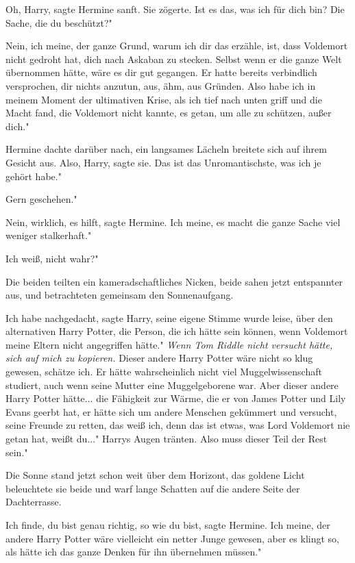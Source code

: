 \glqq Oh, Harry\grqq{}, sagte Hermine sanft. Sie zögerte. \glqq Ist es das, was
ich für dich bin? Die Sache, die du beschützt?"

\glqq Nein, ich meine, der ganze Grund, warum ich dir das erzähle, ist, dass
Voldemort nicht gedroht hat, dich nach Askaban zu stecken. Selbst wenn er die
ganze Welt übernommen hätte, wäre es dir gut gegangen. Er hatte bereits
verbindlich versprochen, dir nichts anzutun, aus, ähm, aus Gründen. Also habe
ich in meinem Moment der ultimativen Krise, als ich tief nach unten griff und
die Macht fand, die Voldemort nicht kannte, es getan, um alle zu schützen, außer
dich."

Hermine dachte darüber nach, ein langsames Lächeln breitete sich auf ihrem
Gesicht aus. \glqq Also, Harry\grqq{}, sagte sie. \glqq Das ist das
Unromantischste, was ich je gehört habe."

\glqq Gern geschehen."

\glqq Nein, wirklich, es hilft\grqq{}, sagte Hermine. \glqq Ich meine, es macht
die ganze Sache viel weniger stalkerhaft."

\glqq Ich weiß, nicht wahr?"

Die beiden teilten ein kameradschaftliches Nicken, beide sahen jetzt entspannter
aus, und betrachteten gemeinsam den Sonnenaufgang.

\glqq Ich habe nachgedacht\grqq{}, sagte Harry, seine eigene Stimme wurde leise,
\glqq über den alternativen Harry Potter, die Person, die ich hätte sein können,
wenn Voldemort meine Eltern nicht angegriffen hätte."
\emph{Wenn Tom Riddle nicht versucht hätte, sich auf mich zu kopieren.}
\glqq Dieser andere Harry Potter wäre nicht so klug gewesen, schätze ich. Er
hätte wahrscheinlich nicht viel Muggelwissenschaft studiert, auch wenn seine
Mutter eine Muggelgeborene war. Aber dieser andere Harry Potter hätte... die
Fähigkeit zur Wärme, die er von James Potter und Lily Evans geerbt hat, er hätte
sich um andere Menschen gekümmert und versucht, seine Freunde zu retten, das
weiß ich, denn das ist etwas, was Lord Voldemort nie getan hat, weißt du..."
Harrys Augen tränten. \glqq Also muss dieser Teil der Rest sein."

Die Sonne stand jetzt schon weit über dem Horizont, das goldene Licht
beleuchtete sie beide und warf lange Schatten auf die andere Seite der
Dachterrasse.

\glqq Ich finde, du bist genau richtig, so wie du bist\grqq{}, sagte Hermine.
\glqq Ich meine, der andere Harry Potter wäre vielleicht ein netter Junge
gewesen, aber es klingt so, als hätte ich das ganze Denken für ihn übernehmen
müssen."

